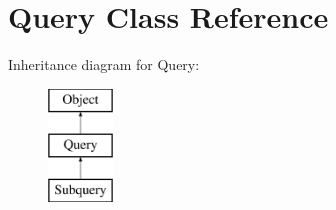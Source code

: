 \hypertarget{classQuery}{\section{Query Class Reference}
\label{classQuery}
}
Inheritance diagram for Query\+:\begin{figure}[H]
\begin{center}
\leavevmode
\includegraphics[height=3.000000cm]{classQuery}
\end{center}
\end{figure}
